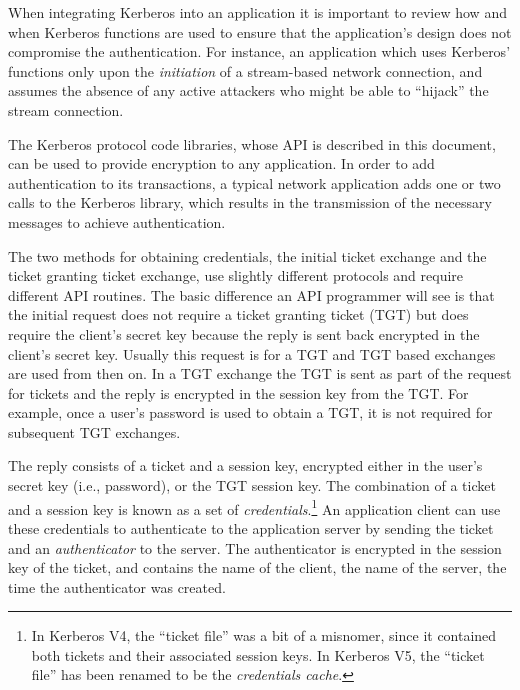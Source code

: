 When integrating Kerberos into an application it is important to
review how and when Kerberos functions are used to ensure that the
application's design does not compromise the authentication.  For
instance, an application which uses Kerberos' functions only upon the
{\em initiation} of a stream-based network connection, and assumes the
absence of any active attackers who might be able to ``hijack'' the
stream connection.


The Kerberos protocol code libraries, whose API is described in this
document, can be used to provide encryption to any application.  In
order to add authentication to its transactions, a typical network
application adds one or two calls to the Kerberos library, which
results in the transmission of the necessary messages to achieve
authentication.

The two methods for obtaining credentials, the initial ticket exchange
and the ticket granting ticket exchange, use slightly different
protocols and require different API routines.  The basic difference an
API programmer will see is that the initial request does not require a
ticket granting ticket (TGT) but does require the client's secret key
because the reply is sent back encrypted in the client's secret key.
Usually this request is for a TGT and TGT based exchanges are used
from then on.  In a TGT exchange the TGT is sent as part of the
request for tickets and the reply is encrypted in the session key from
the TGT.  For example, once a user's password is used to obtain a TGT,
it is not required for subsequent TGT exchanges.

The reply consists of a ticket and a session key, encrypted either in
the user's secret key (i.e., password), or the TGT session key.  The
combination of a ticket and a session key is known as a set of {\em
credentials}.\footnote{In Kerberos V4, the ``ticket file'' was a bit of
a misnomer, since it contained both tickets and their associated session
keys.  In Kerberos V5, the ``ticket file'' has been renamed to be the
{\em credentials cache}.} An application client can use these
credentials to authenticate to the application server by sending the
ticket and an {\em authenticator} to the server.  The authenticator is
encrypted in the session key of the ticket, and contains the name of the
client, the name of the server, the time the authenticator was created.

